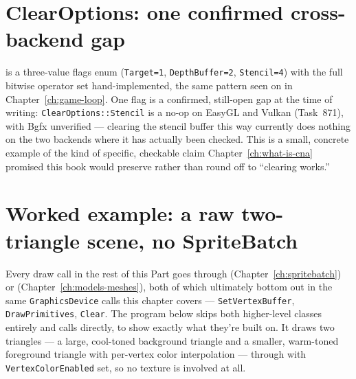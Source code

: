 \section{ClearOptions: one confirmed cross-backend gap}
\label{sec:clearoptions}

 is a three-value flags enum (\texttt{Target=1}, \texttt{DepthBuffer=2},
\texttt{Stencil=4}) with the full bitwise operator set hand-implemented, the same pattern seen
on  in Chapter~\ref{ch:game-loop}. One flag is a confirmed,
still-open gap at the time of writing: \texttt{ClearOptions::Stencil} is a no-op on EasyGL and
Vulkan (Task~871), with Bgfx unverified --- clearing the stencil buffer this way currently does
nothing on the two backends where it has actually been checked. This is a small, concrete
example of the kind of specific, checkable claim Chapter~\ref{ch:what-is-cna} promised this
book would preserve rather than round off to ``clearing works.''

\section{Worked example: a raw two-triangle scene, no SpriteBatch}
\label{sec:worked-drawprimitives}

Every draw call in the rest of this Part goes through 
(Chapter~\ref{ch:spritebatch}) or  (Chapter~\ref{ch:models-meshes}), both of
which ultimately bottom out in the same \texttt{GraphicsDevice} calls this chapter covers ---
\texttt{SetVertexBuffer}, \texttt{DrawPrimitives}, \texttt{Clear}. The program below skips both
higher-level classes entirely and calls  directly, to show exactly what
they're built on. It draws two triangles --- a large, cool-toned background triangle and a
smaller, warm-toned foreground triangle with per-vertex color interpolation --- through
 with \texttt{VertexColorEnabled} set, so no texture is involved at all.

